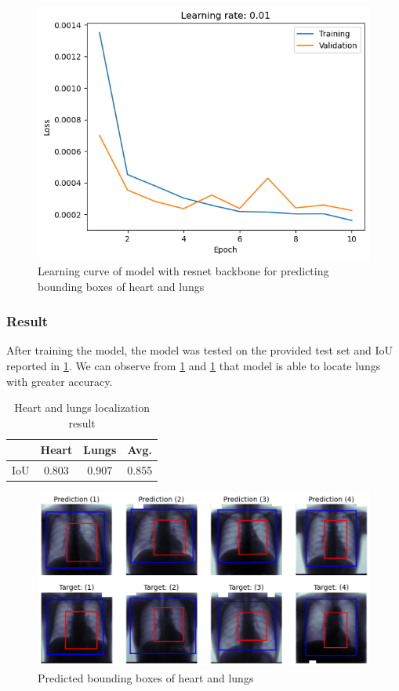     \begin{figure}[htbp]
        \centering
        \includegraphics[width=\linewidth]{../plots/localization/learning.png}
        \caption{Learning curve of model with resnet backbone for predicting bounding boxes of heart and lungs}
        \label{fig:organs-localization-learning-curve}
    \end{figure}


    \subsubsection{Result}
    
    After training the model, the model was tested on the provided test set and IoU reported in \cref{tab:organ-localization-result}. We can observe from \cref{tab:organ-localization-result} and \cref{tab:organ-localization-result} that model is able to locate lungs with greater accuracy.

    \begin{table}
        \centering
        \begin{tabular}{cccc}
          \toprule
            & Heart & Lungs & Avg. \\
          \midrule
           IoU & 0.803 & 0.907 & 0.855 \\
          \bottomrule
        \end{tabular}
        \caption{Heart and lungs localization result}
        \label{tab:organ-localization-result}
      \end{table}

 
    \begin{figure}[htbp]
        \centering
        \includegraphics[width=\linewidth]{../plots/localization/result.png}
        \caption{Predicted bounding boxes of heart and lungs}
        \label{fig:organs-localization-result1}
    \end{figure}